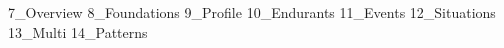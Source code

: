 {7_Overview}
{8_Foundations}
{9_Profile}
{10_Endurants}
{11_Events}
{12_Situations}
{13_Multi}
{14_Patterns}

